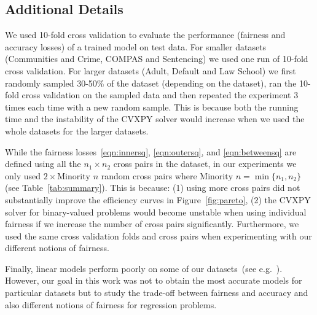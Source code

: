 \subsection{Additional Details}
\label{sec:deets}

We used 10-fold cross validation to evaluate the performance (fairness
and accuracy losses) of a trained model on test data. For smaller
datasets (Communities and Crime, COMPAS and Sentencing) we used one
run of 10-fold cross validation. For larger datasets (Adult, Default
and Law School) we first randomly sampled 30-50\% of the dataset
(depending on the dataset), ran the 10-fold cross validation on the
sampled data and then repeated the experiment 3 times each time with a
new random sample. This is because both the running time and the
instability of the CVXPY solver would increase when we used the whole
datasets for the larger datasets.

While the fairness losses~\ref{eqn:innersq}, \ref{eqn:outersq}, and
\ref{eqn:betweensq} are defined using all the $n_1\times n_2$ cross
pairs in the dataset, in our experiments we only used
$2 \times \text{Minority } n$ random cross pairs where
$\text{Minority } n = \min\{n_1, n_2\}$ (see
Table~\ref{tab:summary}). This is because: (1) using more cross pairs
did not substantially improve the efficiency curves in
Figure~\ref{fig:pareto}, (2) the CVXPY solver for binary-valued
problems would become unstable when using individual fairness if we
increase the number of cross pairs significantly. Furthermore, we used
the same cross validation folds and cross pairs when experimenting
with our different notions of fairness.

Finally, linear models perform poorly on some of our datasets~(see
e.g.~\cite{default-dataset}). However, our goal in this work was not
to obtain the most accurate models for particular datasets but to
study the trade-off between fairness and accuracy and also different
notions of fairness for regression problems.
